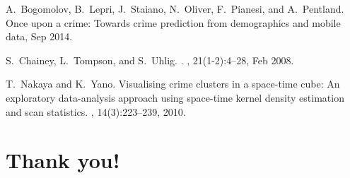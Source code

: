 \documentclass[10pt,ignorenonframetext,]{beamer}
\begin{document}
\begin{frame}

\begin{thebibliography}{1}
A.~Bogomolov, B.~Lepri, J.~Staiano, N.~Oliver, F.~Pianesi, and A.~Pentland.
\newblock Once upon a crime: Towards crime prediction from demographics and
  mobile data, Sep 2014.

S.~Chainey, L.~Tompson, and S.~Uhlig.
.
, 21(1-2):4--28, Feb 2008.

T.~Nakaya and K.~Yano.
\newblock Visualising crime clusters in a space-time cube: An exploratory
  data-analysis approach using space-time kernel density estimation and scan
  statistics.
, 14(3):223--239, 2010.
\end{thebibliography}

\end{frame}

\hypertarget{thank-you}{%
\section{Thank you!}\label{thank-you}}
\end{document}
